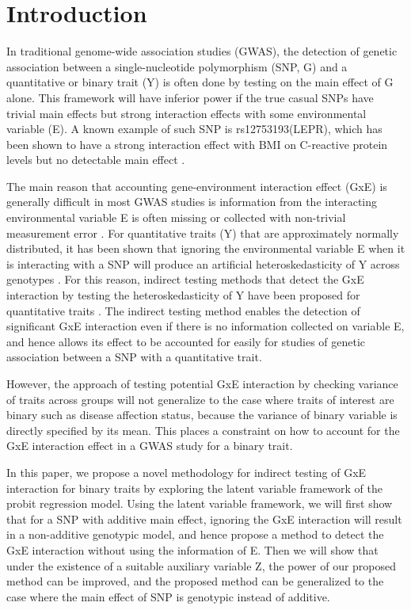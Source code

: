 
\section{Introduction}\label{sec:intro}

In traditional genome-wide association studies (GWAS), the detection of genetic association between a single-nucleotide polymorphism (SNP, G) and a quantitative or binary trait (Y) is often done by testing on the main effect of G alone. This framework will have inferior power if the true casual SNPs have trivial main effects but strong interaction effects with some environmental variable (E). A known example of such SNP is rs12753193(LEPR), which has been shown to have a strong interaction effect with BMI on C-reactive protein levels but no detectable main effect \citep{lepr}.

The main reason that accounting gene-environment interaction effect (GxE) is generally difficult in most GWAS studies is information from the interacting environmental variable E is often missing or collected with non-trivial measurement error \citep{jlst}. For quantitative traits (Y) that are approximately normally distributed, it has been shown that ignoring the environmental variable E when it is interacting with a SNP will produce an artificial heteroskedasticity of Y across genotypes \citep{lepr}. For this reason, indirect testing methods that detect the GxE interaction by testing the heteroskedasticity of Y have been proposed for quantitative traits \citep{jlst,gjlst}. The indirect testing method enables the detection of significant GxE interaction even if there is no information collected on variable E, and hence allows its effect to be accounted for easily for studies of genetic association between a SNP with a quantitative trait.

However, the approach of testing potential GxE interaction by checking variance of traits across groups will not generalize to the case where traits of interest are binary such as disease affection status, because the variance of binary variable is directly specified by its mean. This places a constraint on how to account for the GxE interaction effect in a GWAS study for a binary trait.

In this paper, we propose a novel methodology for indirect testing of GxE interaction for binary traits by exploring the latent variable framework of the probit regression model. Using the latent variable framework, we will first show that for a SNP with additive main effect, ignoring the GxE interaction will result in a non-additive genotypic model, and hence propose a method to detect the GxE interaction without using the information of E. Then we will show that under the existence of a suitable auxiliary variable Z, the power of our proposed method can be improved, and the proposed method can be generalized to the case where the main effect of SNP is genotypic instead of additive.

